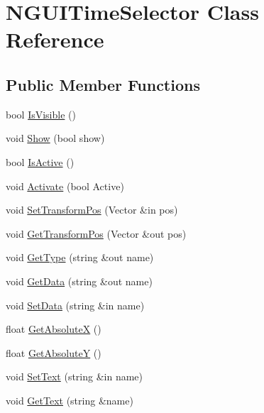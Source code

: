 \hypertarget{class_n_g_u_i_time_selector}{}\section{N\+G\+U\+I\+Time\+Selector Class Reference}
\label{class_n_g_u_i_time_selector}
\subsection*{Public Member Functions}
\begin{DoxyCompactItemize}
\item 
bool \hyperlink{class_n_g_u_i_time_selector_a931125ecad002d634b04ddd7d0c18e49}{Is\+Visible} ()
\item 
void \hyperlink{class_n_g_u_i_time_selector_a0a6ad7fef6a012d8bf2fbdbe91044d77}{Show} (bool show)
\item 
bool \hyperlink{class_n_g_u_i_time_selector_a1027ba613c683cd405594691d7b054c2}{Is\+Active} ()
\item 
void \hyperlink{class_n_g_u_i_time_selector_aea93f854ce5ee0e29c81abfbe6f8d7e8}{Activate} (bool Active)
\item 
void \hyperlink{class_n_g_u_i_time_selector_aba6686924ec86b0ed154908292616674}{Set\+Transform\+Pos} (Vector \&in pos)
\item 
void \hyperlink{class_n_g_u_i_time_selector_ade551cb5ce5c7c54fab00fc6065e12c6}{Get\+Transform\+Pos} (Vector \&out pos)
\item 
void \hyperlink{class_n_g_u_i_time_selector_a71ed7063aa6be5325676f715701c568e}{Get\+Type} (string \&out name)
\item 
void \hyperlink{class_n_g_u_i_time_selector_af5b0af82c4140a643ddb763ab7acb280}{Get\+Data} (string \&out name)
\item 
void \hyperlink{class_n_g_u_i_time_selector_a13d82203e586e883da41b00830ef894e}{Set\+Data} (string \&in name)
\item 
float \hyperlink{class_n_g_u_i_time_selector_a2fab6cf7e413d37990cd33b41ffb99d6}{Get\+AbsoluteX} ()
\item 
float \hyperlink{class_n_g_u_i_time_selector_ad99bb3f95a0a805eb7cd6c2d04a680f9}{Get\+AbsoluteY} ()
\item 
void \hyperlink{class_n_g_u_i_time_selector_a4551bd7323a996114fa3e3a233f1ea36}{Set\+Text} (string \&in name)
\item 
void \hyperlink{class_n_g_u_i_time_selector_a94da848e963f66e3c3c49b604e817e0a}{Get\+Text} (string \&name)
\item 

\end{DoxyCompactItemize}
